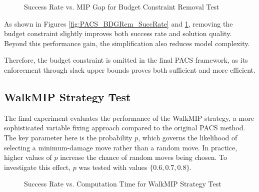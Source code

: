 \begin{figure}[H]
\centering
\begin{minipage}{0.6\columnwidth}
\centering
\resizebox{\linewidth}{!}{}
\end{minipage}%
\hfill
\begin{minipage}{0.4\columnwidth}
\centering
\resizebox{\linewidth}{!}{}
\end{minipage}
\caption{Success Rate vs. MIP Gap for Budget Constraint Removal Test}
\label{fig:PACS_BDGRem_MGAP}
\end{figure}

As shown in Figures \ref{fig:PACS_BDGRem_SuccRate} and \ref{fig:PACS_BDGRem_MGAP}, removing the budget constraint slightly improves both success rate and solution quality. Beyond this performance gain, the simplification also reduces model complexity.

Therefore, the budget constraint is omitted in the final PACS framework, as its enforcement through slack upper bounds proves both sufficient and more efficient.

\subsection{WalkMIP Strategy Test}\label{sec:test_walkMIP}
The final experiment evaluates the performance of the WalkMIP strategy, a more sophisticated variable fixing approach compared to the original PACS method. The key parameter here is the probability $p$, which governs the likelihood of selecting a minimum-damage move rather than a random move. In practice, higher values of $p$ increase the chance of random moves being chosen. To investigate this effect, $p$ was tested with values $\{0.6, 0.7, 0.8\}$.
\begin{figure}[H]
\centering
\begin{minipage}{0.6\columnwidth}
\centering
\resizebox{\linewidth}{!}{}
\end{minipage}%
\hfill
\begin{minipage}{0.4\columnwidth}
\centering
\resizebox{\linewidth}{!}{}
\end{minipage}
\caption{Success Rate vs. Computation Time for WalkMIP Strategy Test}
\label{fig:PACS_WalkMIP_SuccRate}
\end{figure}

